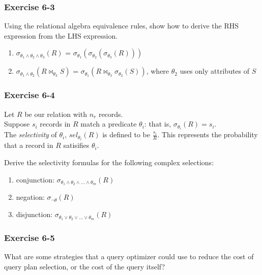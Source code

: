 \begin{frame}
\frametitle{Exercise 6-3}

Using the relational algebra equivalence rules, show how to derive the RHS expression from the LHS expression.

\begin{enumerate}
  \item $\sigma_{\theta_1 \land \theta_2 \land \theta_3}(R)$ = $\sigma_{\theta_1}(\sigma_{\theta_2}(\sigma_{\theta_3}(R)))$
  \item $\sigma_{\theta_1 \land \theta_2}(R \bowtie_{\theta_3} S)$ = $\sigma_{\theta_1}(R \bowtie_{\theta_3} \sigma_{\theta_2}(S))$, where $\theta_2$ uses only attributes of $S$
\end{enumerate}

\end{frame}


\begin{frame}
\frametitle{Exercise 6-4}

Let $R$ be our relation with $n_r$ records. \\
Suppose $s_i$ records in $R$ match a predicate $\theta_i$: that is, $\sigma_{\theta_i}(R) = s_i$. \\
The \textit{selectivity} of $\theta_i$, $sel_{\theta_i}(R)$ is defined to be $\frac{s_i}{R}$. This represents the probability that a record in $R$ satisifies $\theta_i$.

Derive the selectivity formulas for the following complex selections:

\begin{enumerate}
  \item conjunction: $\sigma_{\theta_1 \land \theta_2 \land ... \land \theta_m}(R)$
  \item negation: $\sigma_{\lnot\theta}(R)$
  \item disjunction: $\sigma_{\theta_1 \lor \theta_2 \lor ... \lor \theta_m}(R)$
\end{enumerate}

\end{frame}


\begin{frame}
\frametitle{Exercise 6-5}

What are some strategies that a query optimizer could use to reduce the cost of query plan selection, or the cost of the query itself?

\end{frame}

